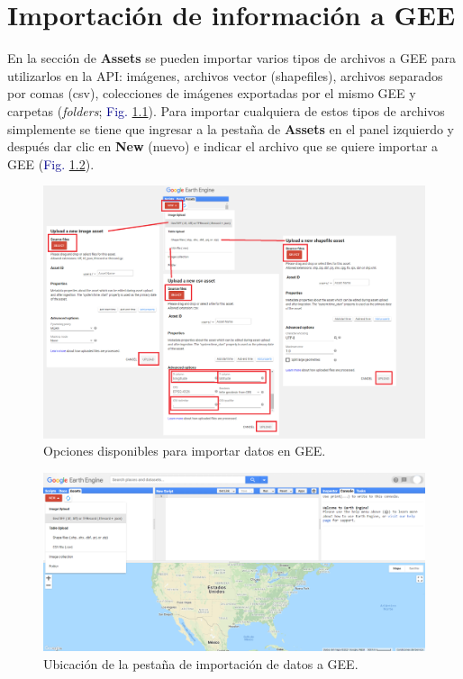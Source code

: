 \documentclass[
  12pt,
  letterpaper,
  twoside]{book}
\begin{document}
\newpage

\hypertarget{importaciuxf3n-de-informaciuxf3n-a-gee}{%
\chapter{Importación de información a GEE}\label{importaciuxf3n-de-informaciuxf3n-a-gee}}

En la sección de \textbf{Assets} se pueden importar varios tipos de archivos a GEE para utilizarlos en la API: imágenes, archivos vector (shapefiles), archivos separados por comas (csv), colecciones de imágenes exportadas por el mismo GEE y carpetas (\emph{folders}; \textcolor{darkblue}{Fig.} \ref{fig:f41}). Para importar cualquiera de estos tipos de archivos simplemente se tiene que ingresar a la pestaña de \textbf{Assets} en el panel izquierdo y después dar clic en \textbf{New} (nuevo) e indicar el archivo que se quiere importar a GEE (\textcolor{darkblue}{Fig.} \ref{fig:f42}).

\begin{figure}[H]

{\centering \includegraphics[width=0.95\linewidth]{Img/newAssets} 

}

\caption{Opciones disponibles para importar datos en GEE.}\label{fig:f41}
\end{figure}

\begin{figure}[H]

{\centering \includegraphics[width=0.95\linewidth]{Img/Asset1} 

}

\caption{Ubicación de la pestaña de importación de datos a GEE.}\label{fig:f42}
\end{figure}
\end{document}
